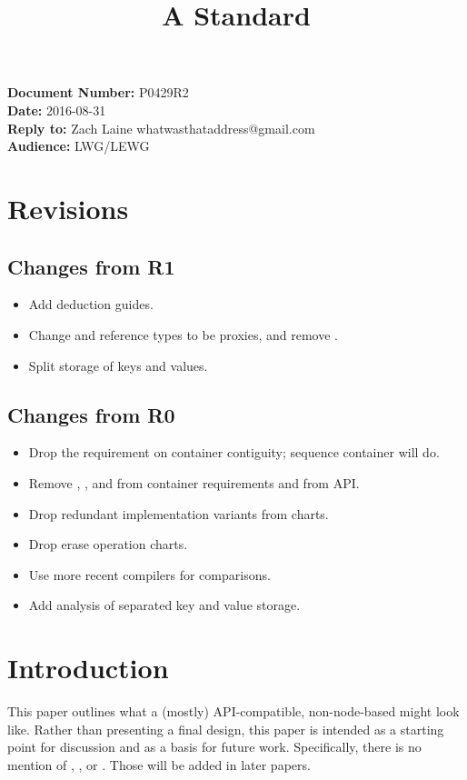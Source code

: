 \documentclass{article}
\begin{document}
\title{\textbf{\Large A Standard }}
\date{}
{\let\newpage\relax\maketitle}

\noindent\textbf{Document Number:} P0429R2\\
\textbf{Date:} 2016-08-31\\
\textbf{Reply to:} Zach Laine whatwasthataddress@gmail.com\\
\textbf{Audience:} LWG/LEWG

\section{Revisions}

\label{sec:revisions}

\subsection{Changes from R1}

\begin{itemize}
  \item Add deduction guides.
  \item Change  and reference types to be proxies, and remove
    .
  \item Split storage of keys and values.
\end{itemize}

\subsection{Changes from R0}

\begin{itemize}
  \item Drop the requirement on container contiguity; sequence container will
    do.
  \item Remove , , and 
    from container requirements and from  API.
  \item Drop redundant implementation variants from charts.
  \item Drop erase operation charts.
  \item Use more recent compilers for comparisons.
  \item Add analysis of separated key and value storage.
\end{itemize}

\section{Introduction}

\label{sec:intro}

This paper outlines what a (mostly) API-compatible, non-node-based 
might look like.  Rather than presenting a final design, this paper is
intended as a starting point for discussion and as a basis for future work.
Specifically, there is no mention of , , or
.  Those will be added in later papers.



\end{document}
